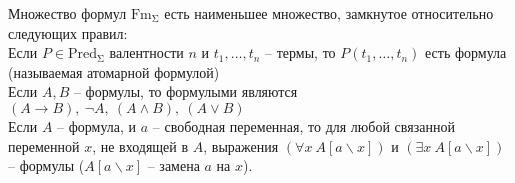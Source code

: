 \begin{defn}
Множество формул $\operatorname{Fm_{\Sigma}}$ есть наименьшее множество, замкнутое относительно следующих правил:\\
Если $P \in \operatorname{Pred_{\Sigma}}$ валентности $n$ и $t_1, \ldots, t_n$ -- термы, то $P(t_1, \ldots, t_n)$ есть формула (называемая атомарной формулой)\\
Если $A,B$ -- формулы, то формулыми являются $(A \to B),\ \neg A,\ (A \wedge B),\ (A \vee B)$\\
Если $A$ -- формула, и $a$ -- свободная переменная, то для любой связанной переменной $x$, не входящей в $A$, выражения $(\forall x\ A[a \backslash x])$ и $(\exists x\ A[a \backslash x])$ -- формулы ($A[a \backslash x]$ -- замена $a$ на $x$).
\end{defn}
